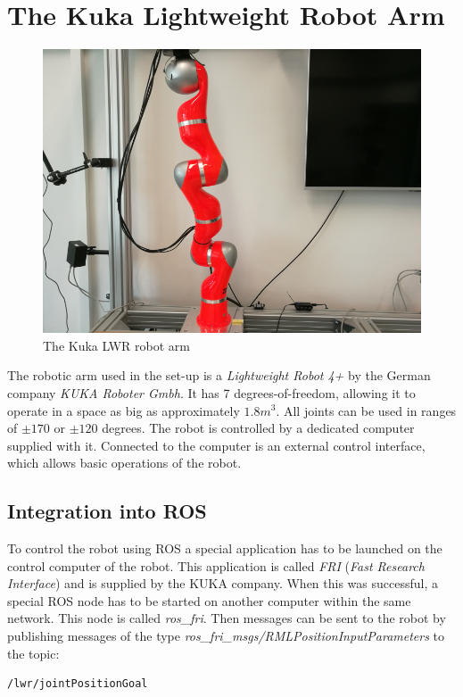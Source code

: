 \section{The Kuka Lightweight Robot Arm}

\begin{figure}
	\vspace{-2.2em}
	\caption{The Kuka LWR robot arm}
	\includegraphics[width=\linewidth]{assets/chpt_basics/arm.png}
\end{figure}

The robotic arm used in the set-up is a \textit{Lightweight Robot 4+} by the German company \textit{KUKA Roboter Gmbh}. It has 7 degrees-of-freedom, allowing it to operate in a space as big as approximately $1.8m^3$\cite{Lwr2010}. All joints can be used in ranges of $\pm 170$ or $\pm 120$ degrees. The robot is controlled by a dedicated computer supplied with it. Connected to the computer is an external control interface, which allows basic operations of the robot.

\subsection{Integration into ROS}

To control the robot using ROS a special application has to be launched on the control computer of the robot. This application is called \textit{FRI} (\textit{Fast Research Interface}) and is supplied by the KUKA company\cite{Fri2010}. When this was successful, a special ROS node has to be started on another computer within the same network. This node is called \textit{ros\_fri}. Then messages can be sent to the robot by publishing messages of the type \textit{ros\_fri\_msgs/RMLPositionInputParameters} to the topic:
\begin{lstlisting}[numbers=none]
/lwr/jointPositionGoal
\end{lstlisting}


